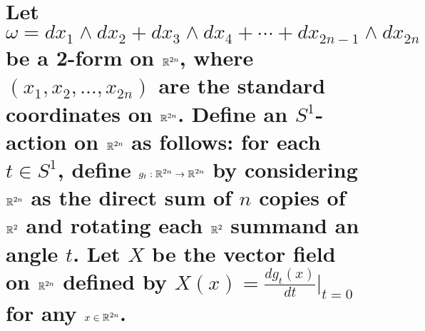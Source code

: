 \documentclass[10pt]{article}
\begin{document}
\section{Let $\omega = dx_1 \wedge dx_2 + dx_3 \wedge dx_4 + \cdots + dx_{2n-1}\wedge dx_{2n}$ be a 2-form on $\mathbb{R}^{2n}$, where $(x_1, x_2, \dots, x_{2n})$ are the standard coordinates on $\mathbb{R}^{2n}$. Define an $S^1$-action on $\mathbb{R}^{2n}$ as follows: for each $t \in S^1$, define $g_t : \mathbb{R}^{2n} \to \mathbb{R}^{2n}$ by considering $\mathbb{R}^{2n}$ as the direct sum of $n$ copies of $\mathbb{R}^2$ and rotating each $\mathbb{R}^2$ summand an angle $t$. Let $X$ be the vector field on $\mathbb{R}^{2n}$ defined by $X(x) = \frac{dg_t(x)}{dt} |_{t=0}$ for any $x \in \mathbb{R}^{2n}$. }
\end{document}
